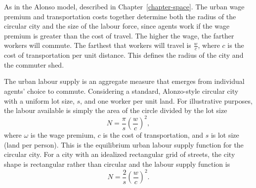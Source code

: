 
As in the Alonso model, described in Chapter~\ref{chapter-space}. The \gls{urban wage premium} and transportation costs together determine both the radius of the circular city and the size of the labour force, %
since agents work if the wage premium is greater than the cost of travel. %
The higher the wage, the farther workers will commute. %
The farthest that workers will travel is $\frac{w}{{c}}$, where ${c}$ is the cost of transportation per unit distance. This defines the radius of the city and the commuter shed.

The \gls{urban labour supply} is an \gls{aggregate} measure that emerges from individual agents' choice to commute. Considering a standard, Alonzo-style \gls{circular city} with a uniform lot size, $s$, and  one worker per unit land. For illustrative purposes, the labour available is simply the area of the circle divided by the lot size 
\begin{equation}
 N = \frac{\pi}{s} \left(\frac{w}{{c}}\right)^2,
\label{eqn-labour-supply1}
\end{equation}
where $\omega$ is the wage premium, $c$ is the cost of transportation, and $s$ is lot size (land per person). This is the equilibrium \gls{urban labour supply} function for the circular city. For a city with an idealized rectangular grid of streets, the city shape is rectangular rather than circular and the labour supply function is \[N= \frac{2}{s}\left(\frac{w}{{c}}\right)^2.\] %

